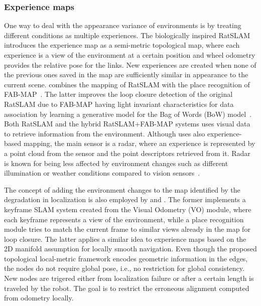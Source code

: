 \subsubsection{Experience maps}
\label{sec:discussion:appearance:exp-maps}

One way to deal with the appearance variance of environments is by treating different conditions as multiple experiences.
The biologically inspired RatSLAM~\parencite{ball-et-al:2013:9} introduces the experience map as a semi-metric topological map, where each experience is a view of the environment at a certain position and wheel odometry provides the relative pose for the links. New experiences are created when none of the previous ones saved in the map are sufficiently similar in appearance to the current scene.
\cite{glover-et-al:2010:5509547} combines the mapping of RatSLAM with the place recognition of FAB-MAP~\parencite{discussion:fab-map}. The latter improves the loop closure detection of the original RatSLAM due to FAB-MAP having light invariant characteristics for data association by learning a generative model for the Bag of Words (BoW) model~\parencite{discussion:bow}.
Both RatSLAM and the hybrid RatSLAM+FAB-MAP systems uses visual data to retrieve information from the environment.
Although \cite{martini-et-al:2020:s20216002} uses also experience-based mapping, the main sensor is a radar, where an experience is represented by a point cloud from the sensor and the point descriptors retrieved from it. Radar is known for being less affected by environment changes such as different illumination or weather conditions compared to vision sensors~\parencite{hong-et-al:2022:02783649221080483}.

The concept of adding the environment changes to the map identified by the degradation in localization is also employed by \cite{konolige-bowman:2009:5354121} and \cite{tang-et-al:2019:7}.
The former implements a keyframe SLAM system created from the Visual Odometry (VO) module, where each keyframe represents a view of the environment, while a place recognition module tries to match the current frame to similar views already in the map for loop closure.
The latter applies a similar idea to experience maps based on the 2D manifold assumption for locally smooth navigation. Even though the proposed topological local-metric framework encodes geometric information in the edges, the nodes do not require global pose, i.e., no restriction for global consistency. New nodes are trigered either from localization failure or after a certain length is traveled by the robot. The goal is to restrict the erroneous alignment computed from odometry locally.

